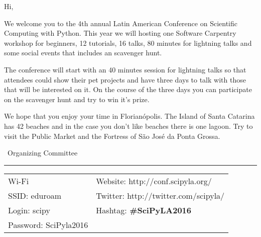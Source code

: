Hi,

We welcome you to the 4th annual Latin American Conference on Scientific Computing with Python.
This year we will hosting one Software Carpentry workshop for beginners,
12 tutorials, 16 talks, 80 minutes for lightning talks
and some social events that includes an scavenger hunt.

The conference will start with an 40 minutes session for lightning talks
so that attendees could show their pet projects and have three days to talk with
those that will be interested on it.
On the course of the three days you can participate on the scavenger hunt
and try to win it's prize.

We hope that you enjoy your time in Florianópolis.
The Island of Santa Catarina has 42 beaches
and in the case you don't like beaches there is one lagoon.
Try to visit the Public Market
and the Fortress of São José da Ponta Grossa.

\textemdash\ Organizing Committee

\vfill

\hrule

\begin{center}
       \begin{tabular}{p{4cm} p{7cm}}
     Wi-Fi & Website: http://conf.scipyla.org/ \\
     SSID: eduroam & Twitter: http://twitter.com/scipyla/ \\
     Login: scipy & Hashtag: \textbf{\#SciPyLA2016} \\
     Password: SciPyla2016 & \\
   \end{tabular}
\end{center}

